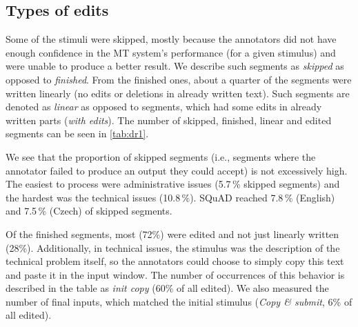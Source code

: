 \subsection{Types of edits}

Some of the stimuli were skipped, mostly because the annotators did not have enough confidence in the MT system's performance (for a given stimulus) and were unable to produce a better result. We describe such segments as \textit{skipped} as opposed to \textit{finished}. From the finished ones, about a quarter of the segments were written linearly (no edits or deletions in already written text). Such segments are denoted as \textit{linear} as opposed to segments, which had some edits in already written parts (\textit{with edits}). The number of skipped, finished, linear and edited segments can be seen in \cref{tab:dr1}.

We see that the proportion of skipped segments (i.e., segments where the annotator failed to produce an output they could accept) is not excessively high. The easiest to process were administrative issues (5.7\,\% skipped segments) and the hardest was the technical issues (10.8\,\%). SQuAD reached 7.8\,\% (English) and 7.5\,\% (Czech) of skipped segments.

Of the finished segments, most (72\%) were edited and not just linearly written (28\%). Additionally, in technical issues, the stimulus was the description of the technical problem itself, so the annotators could choose to simply copy this text and paste it in the input window. The number of occurrences of this behavior is described in the table as \textit{init copy} (60\% of all edited). We also measured the number of final inputs, which matched the initial stimulus (\textit{Copy \& submit}, 6\% of all edited).

\newcommand{\tbofall}{\multirow{2}{*}{\small (of all)}}
\newcommand{\tboffin}{\multirow{2}{*}{\small (of fin.)}}
\newcommand{\tbofedt}{\multirow{2}{*}{\small (of edt.)}}
\newcommand{\tbperc}[1]{\small (#1\%)}


